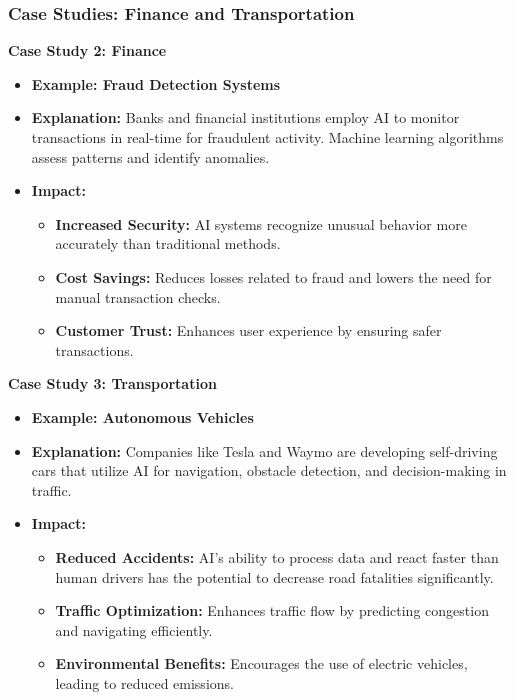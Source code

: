 \documentclass[aspectratio=169]{beamer}
\begin{document}
\begin{frame}[fragile]
    \frametitle{Case Studies: Finance and Transportation}
    \textbf{Case Study 2: Finance}
    \begin{itemize}
        \item \textbf{Example: Fraud Detection Systems}
        \item \textbf{Explanation:} Banks and financial institutions employ AI to monitor transactions in real-time for fraudulent activity. Machine learning algorithms assess patterns and identify anomalies.
        \item \textbf{Impact:}
        \begin{itemize}
            \item \textbf{Increased Security:} AI systems recognize unusual behavior more accurately than traditional methods.
            \item \textbf{Cost Savings:} Reduces losses related to fraud and lowers the need for manual transaction checks.
            \item \textbf{Customer Trust:} Enhances user experience by ensuring safer transactions.
        \end{itemize}
    \end{itemize}

    \textbf{Case Study 3: Transportation}
    \begin{itemize}
        \item \textbf{Example: Autonomous Vehicles}
        \item \textbf{Explanation:} Companies like Tesla and Waymo are developing self-driving cars that utilize AI for navigation, obstacle detection, and decision-making in traffic.
        \item \textbf{Impact:}
        \begin{itemize}
            \item \textbf{Reduced Accidents:} AI’s ability to process data and react faster than human drivers has the potential to decrease road fatalities significantly.
            \item \textbf{Traffic Optimization:} Enhances traffic flow by predicting congestion and navigating efficiently.
            \item \textbf{Environmental Benefits:} Encourages the use of electric vehicles, leading to reduced emissions.
        \end{itemize}
    \end{itemize}
\end{frame}
\end{document}
